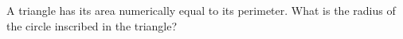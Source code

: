 A triangle has its area numerically equal to its perimeter. What is the radius of the circle inscribed in the triangle?
